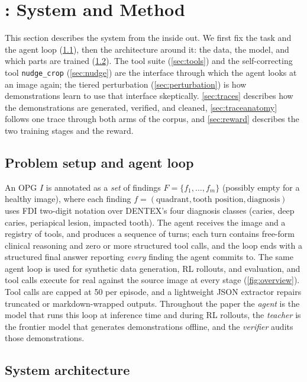 \section{\sys{}: System and Method}
\label{sec:method}

This section describes the system from the inside out. We first fix the task and the agent loop
(\cref{sec:setup}), then the architecture around it: the data, the model, and which parts are trained
(\cref{sec:architecture}). The tool suite (\cref{sec:tools}) and the self-correcting tool \texttt{nudge\_crop}
(\cref{sec:nudge}) are the interface through which the agent looks at an image again; the tiered perturbation
(\cref{sec:perturbation}) is how demonstrations learn to use that interface skeptically. \cref{sec:traces}
describes how the demonstrations are generated, verified, and cleaned, \cref{sec:traceanatomy} follows one
trace through both arms of the corpus, and \cref{sec:reward} describes the two training stages and the reward.

\subsection{Problem setup and agent loop}
\label{sec:setup}

An OPG $I$ is annotated as a \emph{set} of findings $F = \{f_1, \dots, f_m\}$ (possibly empty for
a healthy image), where each finding $f = (\text{quadrant}, \text{tooth position},
\text{diagnosis})$ uses FDI two-digit notation over DENTEX's four diagnosis classes
(caries, deep caries, periapical lesion, impacted tooth). The agent receives the image and a
registry of tools, and produces a sequence of turns; each turn contains free-form clinical
reasoning and zero or more structured tool calls, and the loop ends with a structured final
answer reporting \emph{every} finding the agent commits to. The same agent loop is used for
synthetic data generation, RL rollouts, and evaluation, and tool calls execute for real against
the source image at every stage (\cref{fig:overview}). Tool calls are capped at 50 per episode, and a
lightweight JSON extractor repairs truncated or markdown-wrapped outputs.
Throughout the paper the \emph{agent} is the model that runs this loop at inference time and during RL rollouts, the
\emph{teacher} is the frontier model that generates demonstrations offline, and the \emph{verifier} audits those
demonstrations.


\subsection{System architecture}
\label{sec:architecture}

